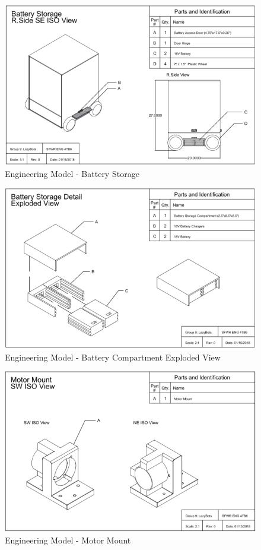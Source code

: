 \documentclass [10pt]{article}
\begin{document}
\begin{figure}
	\centering
	\includegraphics [scale = 0.55] {figures/CAD_Battery_Storage.png}
	\caption{Engineering Model - Battery Storage}
\end{figure}
	
\begin{figure}
	\centering
	\includegraphics [scale = 0.55] {figures/CAD_Battery.png}
	\caption{Engineering Model - Battery Compartment Exploded View}
\end{figure}

\begin{figure}
	\centering
	\includegraphics [scale = 0.55] {figures/CAD_Motor_Mount.png}
	\caption{Engineering Model - Motor Mount}
\end{figure}
\end{document}
